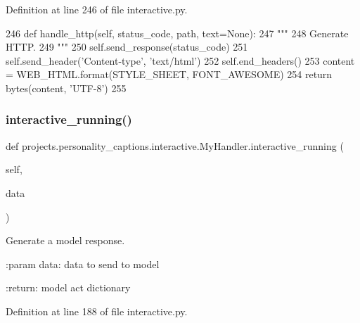 Definition at line 246 of file interactive.\+py.


\begin{DoxyCode}
246     \textcolor{keyword}{def }handle\_http(self, status\_code, path, text=None):
247         \textcolor{stringliteral}{"""}
248 \textcolor{stringliteral}{        Generate HTTP.}
249 \textcolor{stringliteral}{        """}
250         self.send\_response(status\_code)
251         self.send\_header(\textcolor{stringliteral}{'Content-type'}, \textcolor{stringliteral}{'text/html'})
252         self.end\_headers()
253         content = WEB\_HTML.format(STYLE\_SHEET, FONT\_AWESOME)
254         \textcolor{keywordflow}{return} bytes(content, \textcolor{stringliteral}{'UTF-8'})
255 
\end{DoxyCode}
\mbox{\label{classprojects_1_1personality__captions_1_1interactive_1_1MyHandler_ae58a0c4c564f54a29ff85afa26086e47}} 
\subsubsection{\texorpdfstring{interactive\+\_\+running()}{interactive\_running()}}
{\footnotesize\ttfamily def projects.\+personality\+\_\+captions.\+interactive.\+My\+Handler.\+interactive\+\_\+running (\begin{DoxyParamCaption}\item[{}]{self,  }\item[{}]{data }\end{DoxyParamCaption})}

\begin{DoxyVerb}Generate a model response.

:param data:
    data to send to model

:return:
    model act dictionary
\end{DoxyVerb}
 

Definition at line 188 of file interactive.\+py.


